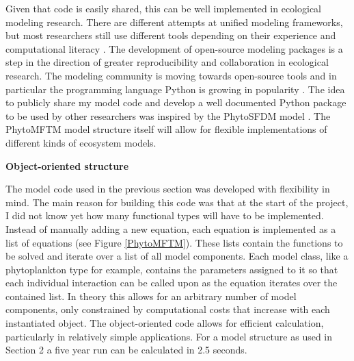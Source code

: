 Given that code is easily shared, this can be well implemented in ecological modeling research. There are different attempts at unified modeling frameworks, but most researchers still use different tools depending on their experience and computational literacy \citep{Michener2012}. The development of open-source modeling packages is a step in the direction of greater reproducibility and collaboration in ecological research. The modeling community is moving towards open-source tools and in particular the programming language Python is growing in popularity \citep{Lin2012}. The idea to publicly share my model code and develop a well documented Python package to be used by other researchers was inspired by the PhytoSFDM model \citep{Acevedo-Trejos2016}. The PhytoMFTM model structure itself will allow for flexible implementations of different kinds of ecosystem models. 






{\textbf{Object-oriented structure}}

The model code used in the previous section was developed with flexibility in mind. The main reason for building this code was that at the start of the project, I did not know yet how many functional types will have to be implemented. Instead of manually adding a new equation, each equation is implemented as a list of equations (see Figure \ref{PhytoMFTM}). These lists contain the functions to be solved and iterate over a list of all model components. Each model class, like a phytoplankton type for example, contains the parameters assigned to it so that each individual interaction can be called upon as the equation iterates over the contained list. In theory this allows for an arbitrary number of model components, only constrained by computational costs that increase with each instantiated object. The object-oriented code allows for efficient calculation, particularly in relatively simple applications. For a model structure as used in Section 2 a five year run can be calculated in 2.5 seconds. 




